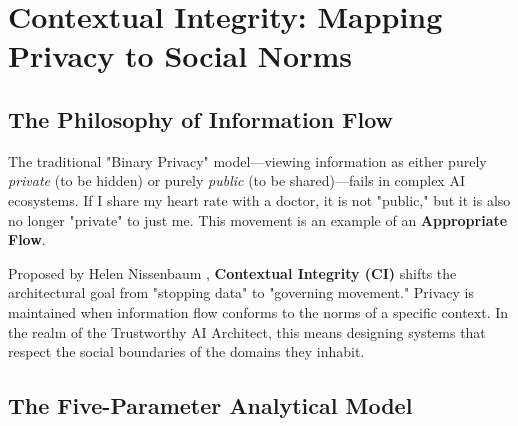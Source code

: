 
\chapter{Contextual Integrity: Mapping Privacy to Social Norms}
\label{chap:contextual_integrity}


\section{The Philosophy of Information Flow}
\label{sec:ci_philosophy}

The traditional "Binary Privacy" model---viewing information as either purely \textit{private} (to be hidden) or purely \textit{public} (to be shared)---fails in complex AI ecosystems. If I share my heart rate with a doctor, it is not "public," but it is also no longer "private" to just me. This movement is an example of an \textbf{Appropriate Flow}.

Proposed by Helen Nissenbaum \cite{science-online}, \textbf{Contextual Integrity (CI)} shifts the architectural goal from "stopping data" to "governing movement." Privacy is maintained when information flow conforms to the norms of a specific context. In the realm of the Trustworthy AI Architect, this means designing systems that respect the social boundaries of the domains they inhabit.

\section{The Five-Parameter Analytical Model}
\label{sec:ci_five_parameters}

